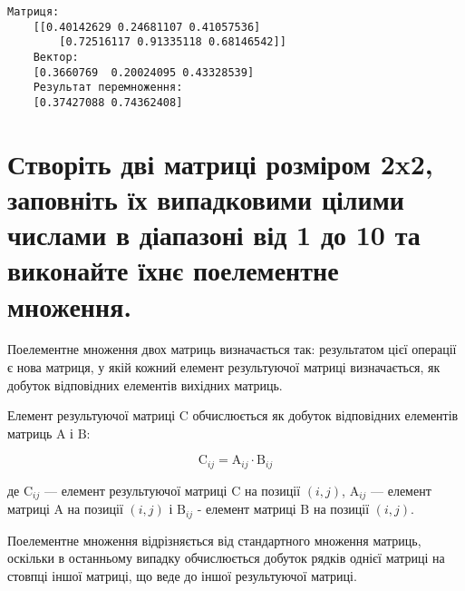\documentclass[]{article}
\newcounter{in}
\begin{document}
\begin{Verbatim}[commandchars=\\\{\}]
	Матриця:
	[[0.40142629 0.24681107 0.41057536]
		[0.72516117 0.91335118 0.68146542]]
	Вектор:
	[0.3660769  0.20024095 0.43328539]
	Результат перемноження:
	[0.37427088 0.74362408]
\end{Verbatim}

\section{Створіть дві матриці розміром 2x2, заповніть їх
	випадковими цілими числами в діапазоні від 1 до 10 та виконайте їхнє
	поелементне
	множення.}

Поелементне множення двох матриць визначається так: результатом цієї
операції є нова матриця, у якій кожний елемент результуючої матриці
визначається, як добуток відповідних елементів вихідних матриць.

Елемент результуючої матриці \(\mathrm C\) обчислюється як добуток
відповідних елементів матриць \(\mathrm A\) і \(\mathrm B\):

\[
	\mathrm C_{ij}  = \mathrm A_{ij} \cdot \mathrm B_{ij}
\]

де \(\mathrm C_{ij}\) --- елемент результуючої матриці \(\mathrm C\) на
позиції \((i, j)\), \(\mathrm A_{ij}\) --- елемент матриці \(\mathrm A\)
на позиції \((i, j)\) і \(\mathrm B_{ij}\) - елемент матриці
\(\mathrm B\) на позиції \((i, j)\).

Поелементне множення відрізняється від стандартного множення матриць,
оскільки в останньому випадку обчислюється добуток рядків однієї матриці
на стовпці іншої матриці, що веде до іншої результуючої матриці.
\end{document}
